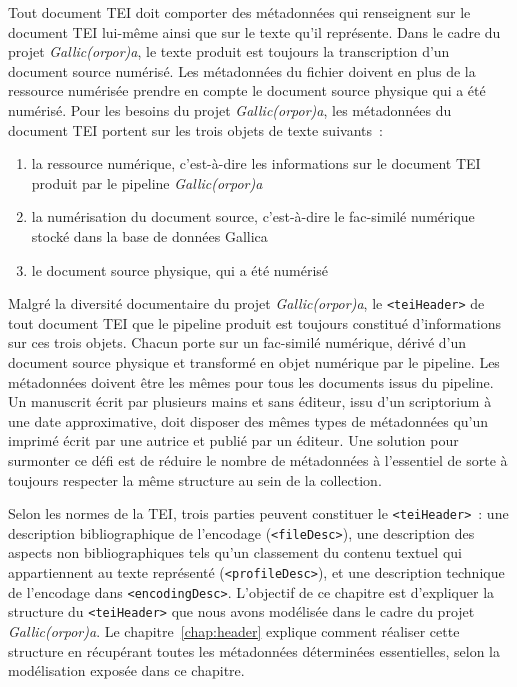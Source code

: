 \documentclass[class=article, crop=false]{standalone}
\begin{document}
Tout document \acrshort{TEI} doit comporter des métadonnées qui renseignent sur le document \acrshort{TEI} lui-même ainsi que sur le texte qu'il représente. Dans le cadre du projet \textit{Gallic(orpor)a}, le texte produit est toujours la transcription d'un document source numérisé. Les métadonnées du fichier doivent en plus de la ressource numérisée prendre en compte le document source physique qui a été numérisé. Pour les besoins du projet \textit{Gallic(orpor)a}, les métadonnées du document \acrshort{TEI} portent sur les trois objets de texte suivants~:
\begin{enumerate}
\item la ressource numérique, c'est-à-dire les informations sur le document \acrshort{TEI} produit par le pipeline \textit{Gallic(orpor)a}
\item la numérisation du document source, c'est-à-dire le fac-similé numérique stocké dans la base de données Gallica
\item le document source physique, qui a été numérisé
\end{enumerate}

Malgré la diversité documentaire du projet \textit{Gallic(orpor)a}, le \texttt{<teiHeader>} de tout document \acrshort{TEI} que le pipeline produit est toujours constitué d'informations sur ces trois objets. Chacun porte sur un fac-similé numérique, dérivé d'un document source physique et transformé en objet numérique par le pipeline. Les métadonnées doivent être les mêmes pour tous les documents issus du pipeline. Un manuscrit écrit par plusieurs mains et sans éditeur, issu d'un scriptorium à une date approximative, doit disposer des mêmes types de métadonnées qu'un imprimé écrit par une autrice et publié par un éditeur. Une solution pour surmonter ce défi est de réduire le nombre de métadonnées à l'essentiel de sorte à toujours respecter la même structure au sein de la collection.

Selon les normes de la \acrshort{TEI}, trois parties peuvent constituer le \texttt{<teiHeader>}~: une description bibliographique de l'encodage (\texttt{<fileDesc>}), une description des aspects non bibliographiques tels qu'un classement du contenu textuel qui appartiennent au texte représenté (\texttt{<profileDesc>}), et une description technique de l'encodage  dans \texttt{<encodingDesc>}. L'objectif de ce chapitre est d'expliquer la structure du \texttt{<teiHeader>} que nous avons modélisée dans le cadre du projet \textit{Gallic(orpor)a}. Le chapitre~\ref{chap:header} explique comment réaliser cette structure en récupérant toutes les métadonnées déterminées essentielles, selon la modélisation exposée dans ce chapitre.
\end{document}
